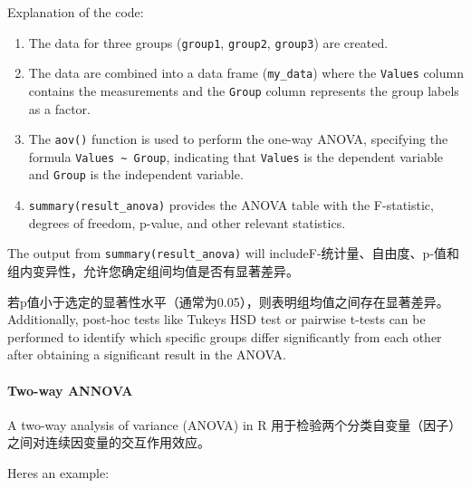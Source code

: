 \documentclass[
]{article}
\begin{document}
Explanation of the code:

\begin{enumerate}
\def\labelenumi{\arabic{enumi}.}
\item
  The data for three groups (\texttt{group1}, \texttt{group2},
  \texttt{group3}) are created.
\item
  The data are combined into a data frame (\texttt{my\_data}) where the
  \texttt{Values} column contains the measurements and the
  \texttt{Group} column represents the group labels as a factor.
\item
  The \texttt{aov()} function is used to perform the one-way ANOVA,
  specifying the formula \texttt{Values\ \textasciitilde{}\ Group},
  indicating that \texttt{Values} is the dependent variable and
  \texttt{Group} is the independent variable.
\item
  \texttt{summary(result\_anova)} provides the ANOVA table with the
  F-statistic, degrees of freedom, p-value, and other relevant
  statistics.
\end{enumerate}

The output from \texttt{summary(result\_anova)} will
includeF-统计量、自由度、p-值和组内变异性，允许您确定组间均值是否有显著差异。

若p值小于选定的显著性水平（通常为0.05），则表明组均值之间存在显著差异。Additionally,
post-hoc tests like Tukey\textquotesingle s HSD test or pairwise t-tests
can be performed to identify which specific groups differ significantly
from each other after obtaining a significant result in the ANOVA.

\hypertarget{two-way-annova}{%
\paragraph{Two-way ANNOVA}\label{two-way-annova}}

A two-way analysis of variance (ANOVA) in R
用于检验两个分类自变量（因子）之间对连续因变量的交互作用效应。

Here\textquotesingle s an example:
\end{document}
